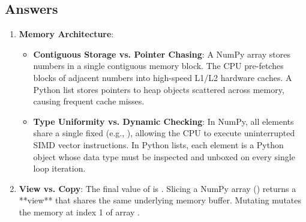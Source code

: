 \subsection*{Answers}

\begin{enumerate}
    \item \textbf{Memory Architecture}:
    \begin{itemize}
        \item \textbf{Contiguous Storage vs. Pointer Chasing}: A NumPy array stores numbers in a single contiguous memory block. The CPU pre-fetches blocks of adjacent numbers into high-speed L1/L2 hardware caches. A Python list stores pointers to heap objects scattered across memory, causing frequent cache misses.
        \item \textbf{Type Uniformity vs. Dynamic Checking}: In NumPy, all elements share a single fixed  (e.g., ), allowing the CPU to execute uninterrupted SIMD vector instructions. In Python lists, each element is a Python object whose data type must be inspected and unboxed on every single loop iteration.
    \end{itemize}

    \item \textbf{View vs. Copy}:
    The final value of  is \code{[10, 99, 30]}. 
    Slicing a NumPy array () returns a **view** that shares the same underlying memory buffer. Mutating  mutates the memory at index 1 of array .


\end{enumerate}
